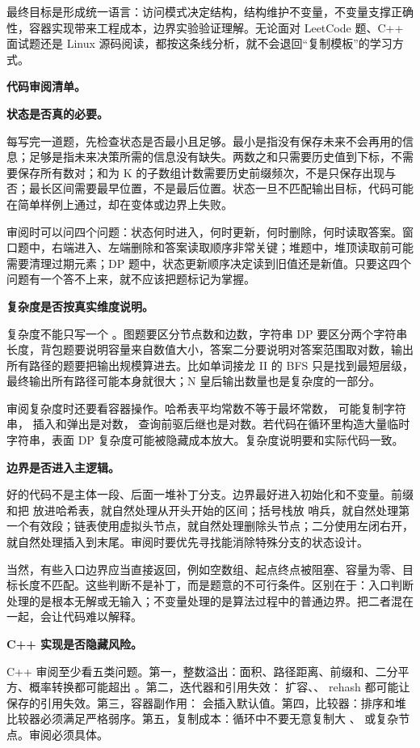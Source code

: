 最终目标是形成统一语言：访问模式决定结构，结构维护不变量，不变量支撑正确性，容器实现带来工程成本，边界实验验证理解。无论面对 LeetCode 题、C++ 面试题还是 Linux 源码阅读，都按这条线分析，就不会退回“复制模板”的学习方式。

\noindent\textbf{代码审阅清单。}

\noindent\textbf{状态是否真的必要。}

每写完一道题，先检查状态是否最小且足够。最小是指没有保存未来不会再用的信息；足够是指未来决策所需的信息没有缺失。两数之和只需要历史值到下标，不需要保存所有数对；和为 K 的子数组计数需要历史前缀频次，不是只保存出现与否；最长区间需要最早位置，不是最后位置。状态一旦不匹配输出目标，代码可能在简单样例上通过，却在变体或边界上失败。

审阅时可以问四个问题：状态何时进入，何时更新，何时删除，何时读取答案。窗口题中，右端进入、左端删除和答案读取顺序非常关键；堆题中，堆顶读取前可能需要清理过期元素；DP 题中，状态更新顺序决定读到旧值还是新值。只要这四个问题有一个答不上来，就不应该把题标记为掌握。

\noindent\textbf{复杂度是否按真实维度说明。}

复杂度不能只写一个 。图题要区分节点数和边数，字符串 DP 要区分两个字符串长度，背包题要说明容量来自数值大小，答案二分要说明对答案范围取对数，输出所有路径的题要把输出规模算进去。比如单词接龙 II 的 BFS 只是找到最短层级，最终输出所有路径可能本身就很大；N 皇后输出数量也是复杂度的一部分。

审阅复杂度时还要看容器操作。哈希表平均常数不等于最坏常数， 可能复制字符串， 插入和弹出是对数， 查询前驱后继也是对数。若代码在循环里构造大量临时字符串，表面 DP 复杂度可能被隐藏成本放大。复杂度说明要和实际代码一致。

\noindent\textbf{边界是否进入主逻辑。}

好的代码不是主体一段、后面一堆补丁分支。边界最好进入初始化和不变量。前缀和把  放进哈希表，就自然处理从开头开始的区间；括号栈放  哨兵，就自然处理第一个有效段；链表使用虚拟头节点，就自然处理删除头节点；二分使用左闭右开，就自然处理插入到末尾。审阅时要优先寻找能消除特殊分支的状态设计。

当然，有些入口边界应当直接返回，例如空数组、起点终点被阻塞、容量为零、目标长度不匹配。这些判断不是补丁，而是题意的不可行条件。区别在于：入口判断处理的是根本无解或无输入；不变量处理的是算法过程中的普通边界。把二者混在一起，会让代码难以解释。

\noindent\textbf{C++ 实现是否隐藏风险。}

C++ 审阅至少看五类问题。第一，整数溢出：面积、路径距离、前缀和、二分平方、概率转换都可能超出 。第二，迭代器和引用失效： 扩容、、 rehash 都可能让保存的引用失效。第三，容器副作用： 会插入默认值。第四，比较器：排序和堆比较器必须满足严格弱序。第五，复制成本：循环中不要无意复制大 、 或复杂节点。审阅必须具体。

